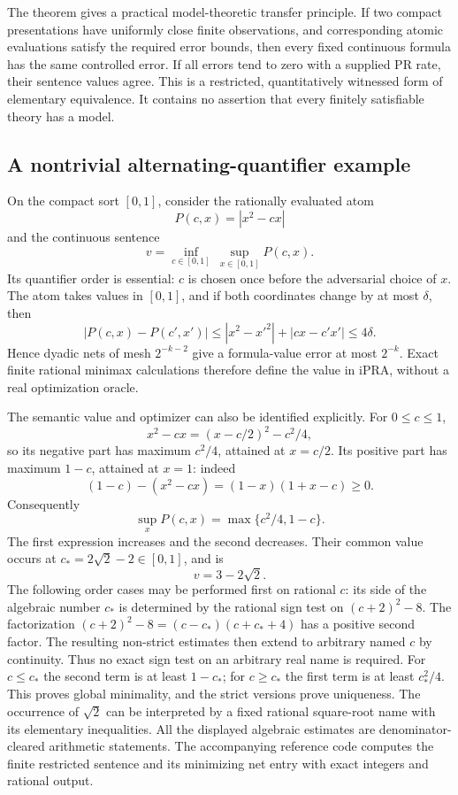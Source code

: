 The theorem gives a practical model-theoretic transfer principle.  If two
compact presentations have uniformly close finite observations, and
corresponding atomic evaluations satisfy the required error bounds, then
every fixed continuous formula has the same controlled error.  If all errors
tend to zero with a supplied PR rate, their sentence values agree.  This is a
restricted, quantitatively witnessed form of elementary equivalence.  It
contains no assertion that every finitely satisfiable theory has a model.

\subsection{A nontrivial alternating-quantifier example}
\label{subsec:cm-minimax}

On the compact sort $[0,1]$, consider the rationally evaluated atom
\[
                  P(c,x)=|x^2-cx|
\]
and the continuous sentence
\[
             v=\inf_{c\in[0,1]}\ \sup_{x\in[0,1]} P(c,x).
\tag{M5}\label{eq:cm-example}
\]
Its quantifier order is essential: $c$ is chosen once before the adversarial
choice of $x$.  The atom takes values in $[0,1]$, and if both coordinates
change by at most $\delta$, then
\[
 |P(c,x)-P(c',x')|
 \leq |x^2-x'^2|+|cx-c'x'|\leq4\delta.
\]
Hence dyadic nets of mesh $2^{-k-2}$ give a formula-value error at most
$2^{-k}$.  Exact finite rational minimax calculations therefore define the
value in iPRA, without a real optimization oracle.

The semantic value and optimizer can also be identified explicitly.  For
$0\leq c\leq1$,
\[
       x^2-cx=(x-c/2)^2-c^2/4,
\]
so its negative part has maximum $c^2/4$, attained at $x=c/2$.
Its positive part has maximum $1-c$, attained at $x=1$: indeed
\[
       (1-c)-(x^2-cx)=(1-x)(1+x-c)\geq0.
\]
Consequently
\[
        \sup_x P(c,x)=\max\{c^2/4,1-c\}.
\]
The first expression increases and the second decreases.  Their common value
occurs at $c_*=2\sqrt2-2\in[0,1]$, and is
\[
                         v=3-2\sqrt2.
\tag{M6}\label{eq:cm-minimax-value}
\]
The following order cases may be performed first on rational $c$: its side
of the algebraic number $c_*$ is determined by the rational sign test on
$(c+2)^2-8$.  The factorization
$(c+2)^2-8=(c-c_*)(c+c_*+4)$ has a positive second factor.
The resulting non-strict estimates then extend to arbitrary named $c$ by
continuity.  Thus no exact sign test on an arbitrary real name is required.
For $c\leq c_*$ the second term is at least $1-c_*$; for $c\geq c_*$ the
first term is at least $c_*^2/4$.  This proves global minimality, and the strict
versions prove uniqueness.  The occurrence of $\sqrt2$ can be interpreted by
a fixed rational square-root name with its elementary inequalities.  All the
displayed algebraic estimates are denominator-cleared arithmetic statements.
The accompanying reference code computes the finite restricted sentence and
its minimizing net entry with exact integers and rational output.

